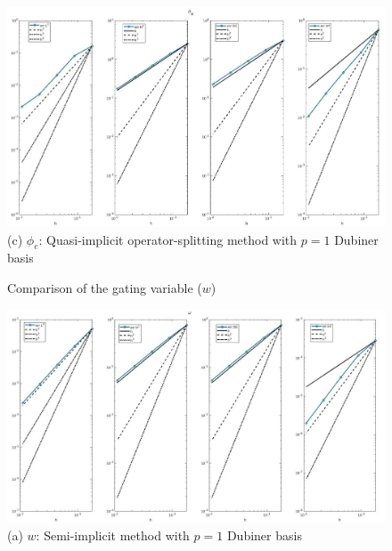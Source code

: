 \documentclass[a4paper,11pt]{article}
\begin{document}
\begin{figure}[h]
\begin{center}
\includegraphics[width =\textwidth]{./D1_Phie_1_OS.jpg}
\caption*{(c) $\phi_e$: Quasi-implicit operator-splitting method with $p=1$ Dubiner basis}
\end{center}
\end{figure}

\begin{figure}[H]
\caption{Comparison of the gating variable ($w$)}
\label{w-time}
\begin{center}
\includegraphics[width = \textwidth]{./D1_w_1.jpg}
\caption*{(a) $w$: Semi-implicit method with $p=1$ Dubiner basis}
\end{center}
\end{figure}
\newpage
\end{document}
